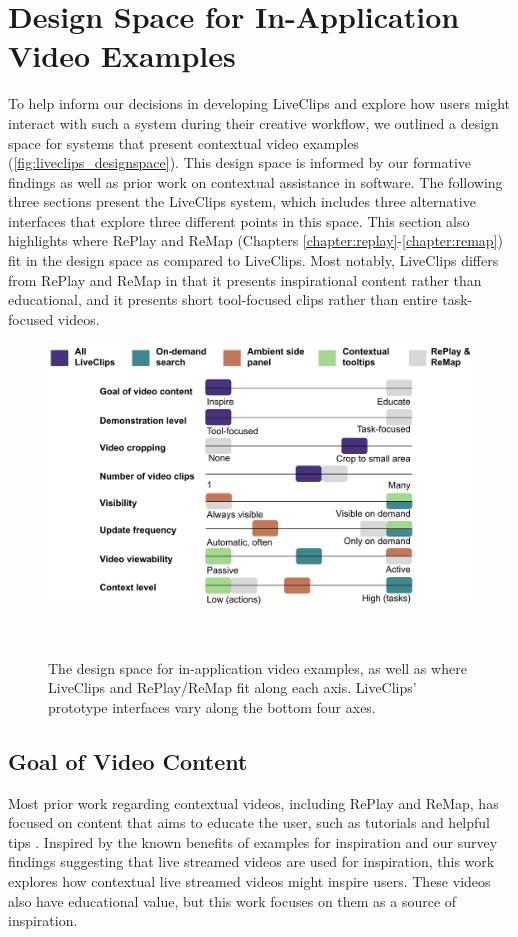 \section{Design Space for In-Application Video Examples}
\label{sec:liveclips_designspace}
To help inform our decisions in developing LiveClips and explore how users might interact with such a system during their creative workflow, we outlined a design space for systems that present contextual video examples (\autoref{fig:liveclips_designspace}). This design space is informed by our formative findings as well as prior work on contextual assistance in software. The following three sections present the LiveClips system, which includes three alternative interfaces that explore three different points in this space. This section also highlights where RePlay and ReMap (Chapters \ref{chapter:replay}-\ref{chapter:remap}) fit in the design space as compared to LiveClips. Most notably, LiveClips differs from RePlay and ReMap in that it presents inspirational content rather than educational, and it presents short tool-focused clips rather than entire task-focused videos.

\begin{figure}[b!]
\centering
  \includegraphics[width=\columnwidth]{liveclips/figures/designspace.png}
  \caption{The design space for in-application video examples, as well as where LiveClips and RePlay/ReMap fit along each axis. LiveClips' prototype interfaces vary along the bottom four axes. }~\label{fig:liveclips_designspace}
\end{figure}

\subsection{Goal of Video Content}
Most prior work regarding contextual videos, including RePlay and ReMap, has focused on content that aims to educate the user, such as tutorials \cite{Pongnumkul2011} and helpful tips \cite{Grossman2010a}. Inspired by the known benefits of examples for inspiration \cite{Kulkarni2014} and our survey findings suggesting that live streamed videos are used for inspiration, this work explores how contextual live streamed videos might inspire users. These videos also have educational value, but this work focuses on them as a source of inspiration.


